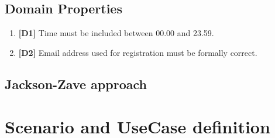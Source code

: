 \documentclass[11pt]{article} %
\begin{document}
    \subsection {Domain Properties}
    \begin{enumerate}
	\item \textbf{[D1]} Time must be included between 00.00 and 23.59.
        	\item \textbf{[D2]} Email address used for registration must be formally correct.
    \end{enumerate}
    \subsection {Jackson-Zave approach}


\section {Scenario and UseCase definition}
\end{document}
